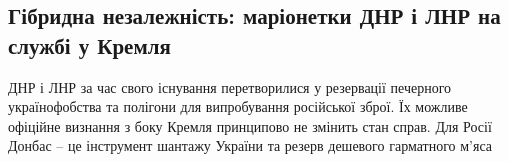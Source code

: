  
 
 
 
 
\subsection{Гібридна незалежність: маріонетки ДНР і ЛНР на службі у Кремля}
\label{sec:21_01_2022.stz.news.ua.fromua.1.lnr_dnr_marionetki}
 

\begin{zznagolos}
ДНР і ЛНР за час свого існування перетворилися у резервації печерного
українофобства та полігони для випробування російської зброї. Їх можливе
офіційне визнання з боку Кремля принципово не змінить стан справ. Для Росії
Донбас – це інструмент шантажу України та резерв дешевого гарматного м’яса
\end{zznagolos}



